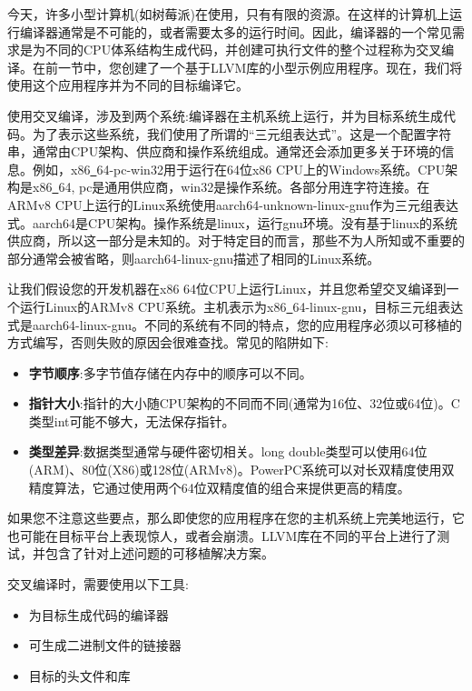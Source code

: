 
今天，许多小型计算机(如树莓派)在使用，只有有限的资源。在这样的计算机上运行编译器通常是不可能的，或者需要太多的运行时间。因此，编译器的一个常见需求是为不同的CPU体系结构生成代码，并创建可执行文件的整个过程称为交叉编译。在前一节中，您创建了一个基于LLVM库的小型示例应用程序。现在，我们将使用这个应用程序并为不同的目标编译它。\par

使用交叉编译，涉及到两个系统:编译器在主机系统上运行，并为目标系统生成代码。为了表示这些系统，我们使用了所谓的“三元组表达式”。这是一个配置字符串，通常由CPU架构、供应商和操作系统组成。通常还会添加更多关于环境的信息。例如，x86\underline{~}64-pc-win32用于运行在64位x86 CPU上的Windows系统。CPU架构是x86\underline{~}64, pc是通用供应商，win32是操作系统。各部分用连字符连接。在ARMv8 CPU上运行的Linux系统使用aarch64-unknown-linux-gnu作为三元组表达式。aarch64是CPU架构。操作系统是linux，运行gnu环境。没有基于linux的系统供应商，所以这一部分是未知的。对于特定目的而言，那些不为人所知或不重要的部分通常会被省略，则aarch64-linux-gnu描述了相同的Linux系统。\par

让我们假设您的开发机器在x86 64位CPU上运行Linux，并且您希望交叉编译到一个运行Linux的ARMv8 CPU系统。主机表示为x86\underline{~}64-linux-gnu，目标三元组表达式是aarch64-linux-gnu。不同的系统有不同的特点，您的应用程序必须以可移植的方式编写，否则失败的原因会很难查找。常见的陷阱如下:\par

\begin{itemize}
	\item \textbf{字节顺序}:多字节值存储在内存中的顺序可以不同。
	\item \textbf{指针大小}:指针的大小随CPU架构的不同而不同(通常为16位、32位或64位)。C类型int可能不够大，无法保存指针。
	\item \textbf{类型差异}:数据类型通常与硬件密切相关。long double类型可以使用64位(ARM)、80位(X86)或128位(ARMv8)。PowerPC系统可以对长双精度使用双精度算法，它通过使用两个64位双精度值的组合来提供更高的精度。
\end{itemize}

如果您不注意这些要点，那么即使您的应用程序在您的主机系统上完美地运行，它也可能在目标平台上表现惊人，或者会崩溃。LLVM库在不同的平台上进行了测试，并包含了针对上述问题的可移植解决方案。\par

交叉编译时，需要使用以下工具:\par

\begin{itemize}
	\item 为目标生成代码的编译器
	\item 可生成二进制文件的链接器
	\item 目标的头文件和库
\end{itemize}

